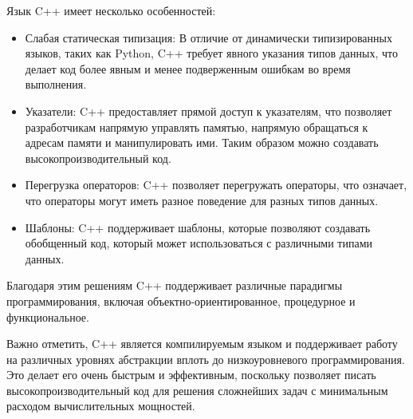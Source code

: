 Язык C++ имеет несколько особенностей:
\begin{itemize}
    \item Слабая статическая типизация: В отличие от динамически типизированных языков, таких как Python, C++ требует явного указания типов данных, что делает код более явным и менее подверженным ошибкам во время выполнения.
    \item Указатели: C++ предоставляет прямой доступ к указателям, что позволяет разработчикам напрямую управлять памятью, напрямую обращаться к адресам памяти и манипулировать ими. Таким образом можно создавать высокопроизводительный код.
    \item Перегрузка операторов: C++ позволяет перегружать операторы, что означает, что операторы могут иметь разное поведение для разных типов данных.
    \item Шаблоны: C++ поддерживает шаблоны, которые позволяют создавать обобщенный код, который может использоваться с различными типами данных.
\end{itemize}

Благодаря этим решениям C++ поддерживает различные парадигмы программирования, включая объектно-ориентированное, процедурное и функциональное.

Важно отметить, C++ является компилируемым языком и поддерживает работу на различных уровнях абстракции вплоть до низкоуровневого программирования. Это делает его очень быстрым и эффективным, поскольку позволяет писать высокопроизводительный код для решения сложнейших задач с минимальным расходом вычислительных мощностей.